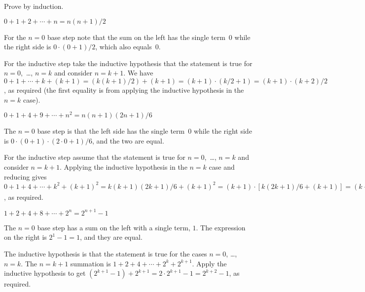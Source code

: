 \documentclass{ibl}  %
\begin{document}
\begin{problem}
Prove by induction.
\begin{exes}
\begin{exercise}
  $0+1+2+\cdots+n=n(n+1)/2$
\end{exercise}
\begin{answer}
  For the $n=0$ base step note that the sum on the left
  has the single term~$0$
  while the right side is $0\cdot(0+1)/2$, which also equals~$0$.

  For the inductive step take the inductive hypothesis 
  that the statement is true for $n=0$,~\ldots, $n=k$ and consider $n=k+1$.
  We have 
  $0+1+\cdots+k+(k+1)=(k(k+1)/2)+(k+1)=(k+1)\cdot(k/2+1)=(k+1)\cdot(k+2)/2$, 
  as required  
  (the first equality is from applying the inductive hypothesis in 
  the $n=k$ case).
\end{answer} 
\begin{exercise}
  $0+1+4+9+\cdots+n^2=n(n+1)(2n+1)/6$
\end{exercise}
\begin{answer} 
  The $n=0$ base step is that the left side has the single term~$0$
  while the right side is $0\cdot(0+1)\cdot(2\cdot 0+1)/6$, and the 
  two are equal.

  For the inductive step assume that the statement is true for 
  $n=0$,~\ldots, $n=k$ and consider $n=k+1$.
  Applying the inductive hypothesis in the $n=k$ case and reducing gives
  $0+1+4+\cdots+k^2+(k+1)^2=k(k+1)(2k+1)/6+(k+1)^2
    =(k+1)\cdot [k(2k+1)/6+(k+1)]
    =(k+1)\cdot [k(2k+1)+6(k+1)]/6
    =(k+1)\cdot [2k^2+7k+6]/6
    =(k+1)(k+2)(2(k+1)+1)/6$,
  as required.
\end{answer}

\begin{exercise}
  $1+2+4+8+\cdots+2^n=2^{n+1}-1$
\end{exercise}
\begin{answer} 
The $n=0$ base step has a sum on the left with a single term, $1$.
The expression on the right is $2^1-1=1$, and they are equal.

The inductive hypothesis is that 
the statement is true for the cases $n=0$, \ldots, $n=k$.
The $n=k+1$ summation is
$1+2+4+\cdots+2^k+2^{k+1}$. 
Apply the inductive hypothesis to get
$(2^{k+1}-1)+2^{k+1}=2\cdot 2^{k+1}-1=2^{k+2}-1$, as required. 
\end{answer}
\end{exes}
\end{problem}
\end{document}
